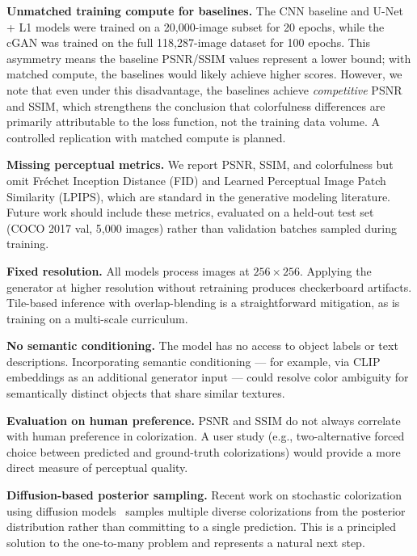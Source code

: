 \documentclass[11pt,a4paper]{article}
\begin{document}
\textbf{Unmatched training compute for baselines.} The CNN baseline and U-Net +
L1 models were trained on a 20,000-image subset for 20 epochs, while the cGAN
was trained on the full 118,287-image dataset for 100 epochs. This asymmetry
means the baseline PSNR/SSIM values represent a lower bound; with matched compute,
the baselines would likely achieve higher scores. However, we note that even
under this disadvantage, the baselines achieve \emph{competitive} PSNR and SSIM,
which strengthens the conclusion that colorfulness differences are primarily
attributable to the loss function, not the training data volume. A controlled
replication with matched compute is planned.

\textbf{Missing perceptual metrics.} We report PSNR, SSIM, and colorfulness but
omit Fr\'echet Inception Distance (FID) and Learned Perceptual Image Patch
Similarity (LPIPS), which are standard in the generative modeling literature.
Future work should include these metrics, evaluated on a held-out test set
(COCO 2017 val, 5,000 images) rather than validation batches sampled during
training.

\textbf{Fixed resolution.} All models process images at $256\times256$.
Applying the generator at higher resolution without retraining produces
checkerboard artifacts. Tile-based inference with overlap-blending is a
straightforward mitigation, as is training on a multi-scale curriculum.

\textbf{No semantic conditioning.} The model has no access to object labels or
text descriptions. Incorporating semantic conditioning — for example, via
CLIP~\cite{radford2021clip} embeddings as an additional generator input — could
resolve color ambiguity for semantically distinct objects that share similar
textures.

\textbf{Evaluation on human preference.} PSNR and SSIM do not always correlate
with human preference in colorization. A user study (e.g., two-alternative forced
choice between predicted and ground-truth colorizations) would provide a more
direct measure of perceptual quality.

\textbf{Diffusion-based posterior sampling.} Recent work on stochastic
colorization using diffusion models~\cite{saharia2022palette} samples multiple
diverse colorizations from the posterior distribution rather than committing to a
single prediction. This is a principled solution to the one-to-many problem and
represents a natural next step.

\end{document}
